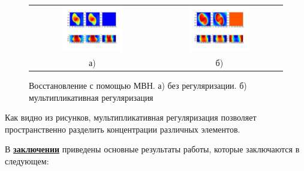 \begin{figure}
\label{fig:whiteres}
\centering
\begin{tabular}{@{}c@{}c}
  \includegraphics[width=0.5\textwidth]{Dissertation/images/part3_img/no_reg_iteration_25} &
  \includegraphics[width=0.5\textwidth]{Dissertation/images/part3_img/mul_reg_iteration_150}
  \\
  а) &
  б) \\
\end{tabular}
\caption{Восстановление с помощью МВН. а) без регуляризации. б) мультипликативная регуляризация}
\vspace{5mm}
\end{figure}


Как видно из рисунков, мультипликативная регуляризация позволяет пространственно разделить концентрации различных элементов.

В \underline{\textbf{заключении}} приведены основные результаты работы, которые заключаются в следующем:

